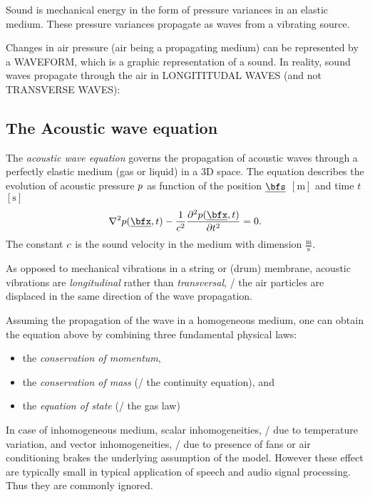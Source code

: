 Sound is mechanical energy in the form of pressure variances in an elastic medium. These pressure variances propagate as waves from a vibrating source.

Changes in air pressure (air being a propagating medium) can be represented by a WAVEFORM, which is a graphic representation of a sound. In reality, sound waves propagate through the air in LONGITITUDAL WAVES (and not TRANSVERSE WAVES):

\subsection{The Acoustic wave equation}
\label{subsec:acoustics:waveq}

The \textit{acoustic wave equation} governs the propagation of acoustic waves through a perfectly elastic medium (gas or liquid) in a 3D space.
The equation describes the evolution of acoustic pressure $p$ as function of the position $\positionSource$ $[\si{\metre}]$ and time $t$ $[\si{\second}]$
\begin{equation}
    \label{eq:acoustics:wave}
    \knabla^2 \pressureSpaceTime - \frac{1}{\speedOfSound^2} \kpderiv[2]{\pressureSpaceTime}{t} = 0
    .
\end{equation}
The constant $c$ is the sound velocity in the medium with dimension $\frac{\si{\metre}}{\si{\second}}$.

As opposed to mechanical vibrations in a string or (drum) membrane, acoustic vibrations are \textit{longitudinal} rather than \textit{transversal},
\ie/ the air particles are displaced in the same direction of the wave propagation.

Assuming the propagation of the wave in a homogeneous medium, one can obtain the equation above by combining three fundamental physical laws:
\begin{itemize}
    \item the \textit{conservation of momentum},
    \item the \textit{conservation of mass} (\aka/ the continuity equation), and
    \item the \textit{equation of state} (\aka/ the gas law)
\end{itemize}
In case of inhomogeneous medium, scalar inhomogeneities, \eg/ due to temperature variation,
and vector inhomogeneities, \eg/ due to presence of fans or air conditioning
brakes the underlying assumption of the model.
However these effect are typically small in typical application of speech and audio signal processing.
Thus they are commonly ignored.

